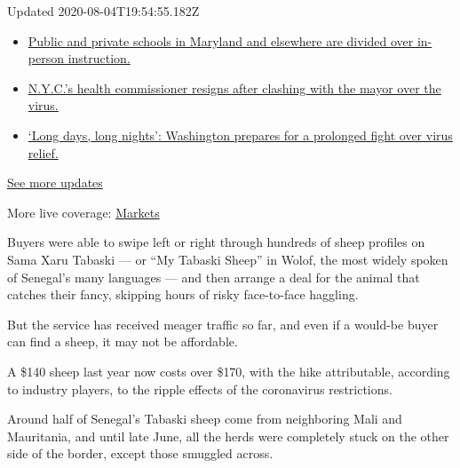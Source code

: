 Updated 2020-08-04T19:54:55.182Z

\begin{itemize}
\tightlist
\item
  \href{https://www.nytimes3xbfgragh.onion/2020/08/04/world/coronavirus-cases.html?action=click\&pgtype=Article\&state=default\&region=MAIN_CONTENT_1\&context=storylines_live_updates\#link-4825b93}{Public
  and private schools in Maryland and elsewhere are divided over
  in-person instruction.}
\item
  \href{https://www.nytimes3xbfgragh.onion/2020/08/04/world/coronavirus-cases.html?action=click\&pgtype=Article\&state=default\&region=MAIN_CONTENT_1\&context=storylines_live_updates\#link-4d1eafa8}{N.Y.C.'s
  health commissioner resigns after clashing with the mayor over the
  virus.}
\item
  \href{https://www.nytimes3xbfgragh.onion/2020/08/04/world/coronavirus-cases.html?action=click\&pgtype=Article\&state=default\&region=MAIN_CONTENT_1\&context=storylines_live_updates\#link-6b644638}{`Long
  days, long nights': Washington prepares for a prolonged fight over
  virus relief.}
\end{itemize}

\href{https://www.nytimes3xbfgragh.onion/2020/08/04/world/coronavirus-cases.html?action=click\&pgtype=Article\&state=default\&region=MAIN_CONTENT_1\&context=storylines_live_updates}{See
more updates}

More live coverage:
\href{https://www.nytimes3xbfgragh.onion/live/2020/08/04/business/stock-market-today-coronavirus?action=click\&pgtype=Article\&state=default\&region=MAIN_CONTENT_1\&context=storylines_live_updates}{Markets}

Buyers were able to swipe left or right through hundreds of sheep
profiles on Sama Xaru Tabaski --- or ``My Tabaski Sheep'' in Wolof, the
most widely spoken of Senegal's many languages --- and then arrange a
deal for the animal that catches their fancy, skipping hours of risky
face-to-face haggling.

But the service has received meager traffic so far, and even if a
would-be buyer can find a sheep, it may not be affordable.

A \$140 sheep last year now costs over \$170, with the hike
attributable, according to industry players, to the ripple effects of
the coronavirus restrictions.

Around half of Senegal's Tabaski sheep come from neighboring Mali and
Mauritania, and until late June, all the herds were completely stuck on
the other side of the border, except those smuggled across.

